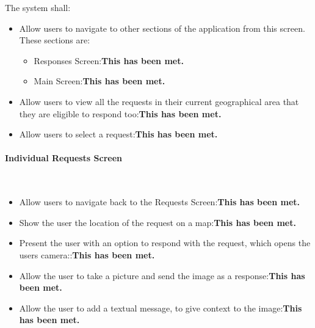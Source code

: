 \documentclass[a4paper]{article}
\newcommand{\subsubsubsection}[1]{\paragraph{#1}\mbox{}\\}
\begin{document}
The system shall:
\begin{itemize}

\item Allow users to navigate to other sections of the application from this screen. These sections are:
\begin{itemize}
\item Responses Screen:\textbf{This has been met.} 
\item Main Screen:\textbf{This has been met.} 
\end{itemize}
\item Allow users to view all the requests in their current geographical area that they are eligible to respond too:\textbf{This has been met.} 
\item Allow users to select a request:\textbf{This has been met.} 
\end{itemize}
\subsubsubsection{Individual Requests Screen}
\begin{itemize}
\item Allow users to navigate back to the Requests Screen:\textbf{This has been met.} 
\item Show the user the location of the request on a map:\textbf{This has been met.} 
\item Present the user with an option to respond with the request, which opens the users camera::\textbf{This has been met.} 
\item Allow the user to take a picture and send the image as a response:\textbf{This has been met.}
\item Allow the user to add a textual message, to give context to the image:\textbf{This has been met.} 
\end{itemize}
\end{document}

